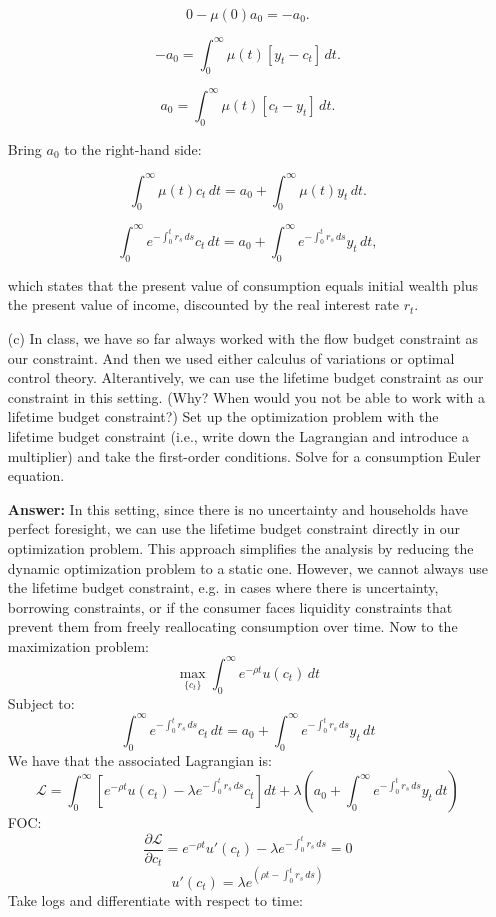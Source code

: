 \documentclass[11pt]{extarticle}
\theoremstyle{plain}
\theoremstyle{definition}
\begin{document}
\begin{enumerate}
\[
0 - \mu(0) a_0 = -a_0.
\]

\[
-a_0 = \int_0^\infty \mu(t) [ y_t - c_t ] \, dt.
\]

\[
a_0 = \int_0^\infty \mu(t) [ c_t - y_t ] \, dt.
\]

Bring \( a_0 \) to the right-hand side:

\[
\int_0^\infty \mu(t) c_t \, dt = a_0 + \int_0^\infty \mu(t) y_t \, dt.
\]

\[
\int_0^\infty e^{ -\int_0^t r_s \, ds } c_t \, dt = a_0 + \int_0^\infty e^{ -\int_0^t r_s \, ds } y_t \, dt,
\]

which states that the present value of consumption equals initial wealth plus the present value of income, discounted by the real interest rate \( r_t \).

	
\item [(c)] In class, we have so far always worked with the flow budget constraint as our constraint. And then we used either calculus of variations or optimal control theory. Alterantively, we can use the lifetime budget constraint as our constraint in this setting. (Why? When would you not be able to work with a lifetime budget constraint?) Set up the optimization problem with the lifetime budget constraint (i.e., write down the Lagrangian and introduce a multiplier) and take the first-order conditions. Solve for a consumption Euler equation.

\textbf{Answer:} In this setting, since there is no uncertainty and households have perfect foresight, we can use the lifetime budget constraint directly in our optimization problem. This approach simplifies the analysis by reducing the dynamic optimization problem to a static one. However, we cannot always use the lifetime budget constraint, e.g. in cases where there is uncertainty, borrowing constraints, or if the consumer faces liquidity constraints that prevent them from freely reallocating consumption over time. Now to the maximization problem:
\[
\max_{ \{ c_t \} } \int_0^\infty e^{ -\rho t } u(c_t) \, dt
\]
Subject to:
\[
\int_0^\infty e^{ -\int_0^t r_s \, ds } c_t \, dt = a_0 + \int_0^\infty e^{ -\int_0^t r_s \, ds } y_t \, dt
\]
We have that the associated Lagrangian is:
\[
\mathcal{L} = \int_0^\infty \left[ e^{ -\rho t } u(c_t) - \lambda e^{ -\int_0^t r_s \, ds } c_t \right] dt + \lambda \left( a_0 + \int_0^\infty e^{ -\int_0^t r_s \, ds } y_t \, dt \right)
\]
FOC:
\[
\frac{ \partial \mathcal{L} }{ \partial c_t } = e^{ -\rho t } u'(c_t) - \lambda e^{ -\int_0^t r_s \, ds } = 0
\]
\[
u'(c_t) = \lambda e^{ (\rho t - \int_0^t r_s \, ds ) }
\]
Take logs and differentiate with respect to time:


\end{enumerate}
\end{document}
